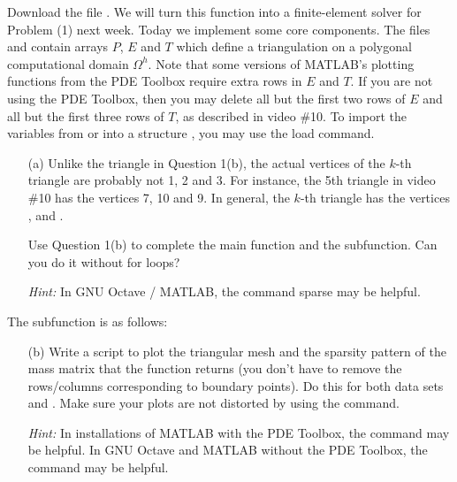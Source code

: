 \begin{problem}{2}
Download the file .
We will turn this function into a
finite-element solver for Problem (1) next week.
Today we implement some core components.
The files  and 
contain arrays $P$, $E$ and $T$ which define a triangulation
on a polygonal computational domain $\Omega^h$.
Note that some versions of MATLAB's
plotting functions from the PDE Toolbox require extra
rows in $E$ and $T$.
If you are not using the PDE Toolbox, then you may delete all
but the first two rows of $E$ and all
but the first three rows of $T$,
as described in video \#10.
To import the variables from  or 
 into a structure ,
you may use the load command.

\begin{itemize}
	\item[(a)] Unlike the triangle in Question 1(b),
	the actual vertices of the $k$-th triangle are probably
	not 1, 2 and 3. For instance, the 5th triangle in video \#10
	has the vertices 7, 10 and 9.
	In general, the $k$-th triangle has the vertices
	,  and .
	
	Use Question 1(b) to complete the main function and the
	 subfunction.
	Can you do it without for loops?
	
	\textit{Hint:} In GNU Octave / MATLAB,
	the command sparse may be helpful.
\end{itemize}

\begin{solution} 
The  subfunction is as follows:

\end{solution}
\pagebreak

\begin{itemize}
	\item[(b)] Write a script  to plot the triangular mesh
	and the sparsity pattern of the mass matrix that the
	function  returns
	(you don’t have to remove the rows/columns corresponding
	to boundary points). Do this for both data sets 
	and .
	Make sure your plots are not distorted by using the
	 command.
	
	\textit{Hint:} In installations of MATLAB with the PDE Toolbox,
	the command  may be helpful.
	In GNU Octave and MATLAB without the PDE Toolbox,
	the command  may be helpful.
\end{itemize}


\end{problem}
